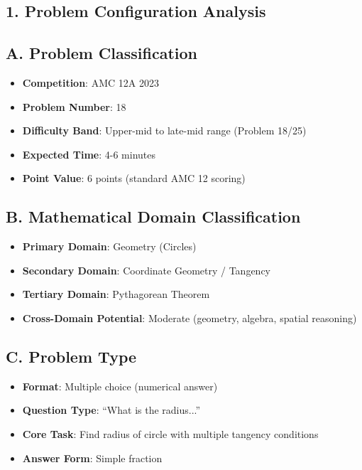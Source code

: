 \documentclass[11pt]{article}
\begin{document}
\begin{problembox}
\section*{1. Problem Configuration Analysis}

\subsection*{A. Problem Classification}
\begin{itemize}[leftmargin=*]
    \item \textbf{Competition}: AMC 12A 2023
    \item \textbf{Problem Number}: 18
    \item \textbf{Difficulty Band}: Upper-mid to late-mid range (Problem 18/25)
    \item \textbf{Expected Time}: 4-6 minutes
    \item \textbf{Point Value}: 6 points (standard AMC 12 scoring)
\end{itemize}

\subsection*{B. Mathematical Domain Classification}
\begin{itemize}[leftmargin=*]
    \item \textbf{Primary Domain}: Geometry (Circles)
    \item \textbf{Secondary Domain}: Coordinate Geometry / Tangency
    \item \textbf{Tertiary Domain}: Pythagorean Theorem
    \item \textbf{Cross-Domain Potential}: Moderate (geometry, algebra, spatial reasoning)
\end{itemize}

\subsection*{C. Problem Type}
\begin{itemize}[leftmargin=*]
    \item \textbf{Format}: Multiple choice (numerical answer)
    \item \textbf{Question Type}: ``What is the radius...''
    \item \textbf{Core Task}: Find radius of circle with multiple tangency conditions
    \item \textbf{Answer Form}: Simple fraction
\end{itemize}


\end{problembox}
\end{document}
